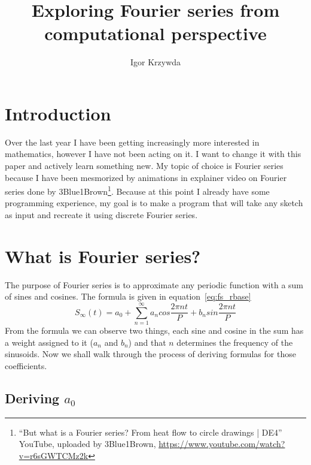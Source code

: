 \documentclass[titlepage]{article}
\title{Exploring Fourier series from computational perspective}
\author{Igor Krzywda}
\begin{document}
\maketitle
\tableofcontents
\pagebreak

\section{Introduction}

    Over the last year I have been getting increasingly more interested in mathematics,
    however I have not been acting on it. I want to change it with this paper 
    and actively learn something new. My topic of choice is Fourier series because
    I have been mesmorized by animations in explainer video on Fourier series done
    by 3Blue1Brown\footnote{``But what is a Fourier series? From heat flow to circle drawings | DE4'' 
    YouTube, uploaded by 3Blue1Brown, \url{https://www.youtube.com/watch?v=r6sGWTCMz2k}}.
    Because at this point I already have some programming experience, my goal is 
    to make a program that will take any sketch as input and recreate it using 
    discrete Fourier series.

\section{What is Fourier series?}

    The purpose of Fourier series is to approximate any periodic function with
    a sum of sines and cosines. The formula is given in equation~\eqref{eq:fs_rbase}
    \begin{equation} \label{eq:fs_rbase}
        S_\infty(t) = a_0 + \sum_{n=1}^{\infty}a_ncos\frac{2\pi nt}{P} + b_n%
            sin\frac{2\pi nt}{P}
    \end{equation}
    From the formula we can observe two things, each sine and cosine in the sum
    has a weight assigned to it ($a_n$ and $b_n$) and that $n$ determines the 
    frequency of the sinusoids. Now we shall walk through the process of deriving
    formulas for those coefficients.

\subsection{Deriving $a_0$}
    
\end{document}

